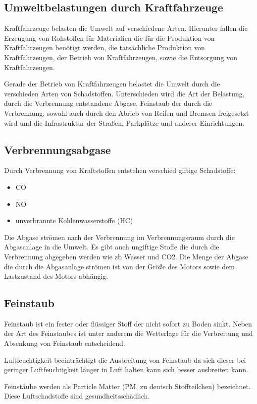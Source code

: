 \subsection{Umweltbelastungen durch Kraftfahrzeuge}
Kraftfahrzeuge belasten die Umwelt auf verschiedene Arten.
Hierunter fallen
die Erzeugung von Rohstoffen für Materialien die für die Produktion von Kraftfahrzeugen benötigt werden,
die tatsächliche Produktion von Kraftfahrzeugen,
der Betrieb von Kraftfahrzeugen,
sowie die Entsorgung von Kraftfahrzeugen.

Gerade der Betrieb von Kraftfahrzeugen belastet die Umwelt durch die verschieden Arten von Schadstoffen.
Unterschieden wird die Art der Belastung,
durch die Verbrennung entstandene Abgase,
Feinstaub der durch die Verbrennung, sowohl auch durch den Abrieb von Reifen und Bremsen freigesetzt wird
und die Infrastruktur der Straßen, Parkplätze und anderer Einrichtungen.

\subsection{Verbrennungsabgase}
Durch Verbrennung von Kraftstoffen entstehen verschied giftige Schadstoffe:
\begin{itemize}
	\item {\ac{CO}}
	\item {\ac{NO}}
	\item unverbrannte Kohlenwasserstoffe (HC)
\end{itemize}
Die Abgase strömen nach der Verbrennung im Verbrennungsraum durch die Abgasanlage in die Umwelt.
Es gibt auch ungiftige Stoffe die durch die Verbrennung abgegeben werden wie \ac{zb} \ac{Wasser} und \ac{CO2}.
Die Menge der Abgase die durch die Abgasanlage strömen ist von der Größe des Motors sowie dem Lastzustand des Motors abhängig.

\subsection{Feinstaub}
Feinstaub ist ein fester oder flüssiger Stoff der nicht sofort zu Boden sinkt.
Neben der Art des Feinstaubes ist unter anderem die Wetterlage für die Verbreitung und Absenkung von Feinstaub entscheidend.

Luftfeuchtigkeit beeinträchtigt die Ausbreitung von Feinstaub da sich dieser bei geringer Luftfeuchtigkeit länger in Luft halten kann sich besser ausbreiten kann.

Feinstäube werden als Particle Matter (PM, zu deutsch Stoffteilchen) bezeichnet. Diese Luftschadstoffe sind gesundheitsschädlich.

